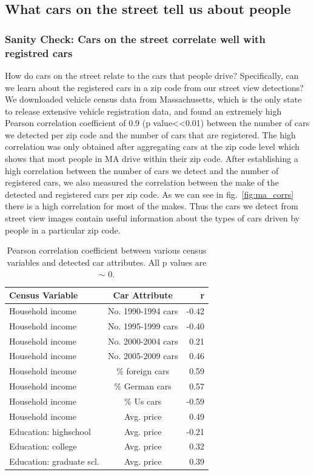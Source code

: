 \documentclass[10pt,twocolumn,letterpaper]{article}
\begin{document}
\subsection{What cars on the street tell us about people}
\subsubsection{Sanity Check: Cars on the street correlate well with registred cars}
How do cars on the street relate to the cars that people drive? Specifically, can we learn about the registered cars in a zip code from our street view detections?
We downloaded vehicle census data from Massachusetts, which is the only state to release extensive vehicle registration data, and found an extremely high Pearson correlation coefficient of 0.9 (p value<<0.01) between the number of cars we detected per zip code and the number of cars that are registered. The high correlation was only obtained after aggregating cars at the zip code level which shows that most people in MA drive within their zip code. 
After establishing a high correlation between the number of cars we detect and the number of registered cars, we also measured the correlation between the make of the detected and registered cars per zip code. As we can see in fig.~\ref{fig:ma_corrs} there is a high correlation for most of the makes. Thus the cars we detect from street view images contain useful information about the types of cars driven by people in a particular zip code.

\begin{table}
\begin{center}
\begin{tabular}{|l|c|r|}
\hline
\textbf{Census Variable} & \textbf{Car Attribute} & \textbf{r}  \\
\hline\hline
Household income & No. 1990-1994 cars & -0.42 \\
Household income & No. 1995-1999 cars & -0.40 \\
Household income & No. 2000-2004 cars & 0.21 \\
Household income & No. 2005-2009 cars & 0.46 \\
Household income & \% foreign cars & 0.59 \\
Household income & \% German cars & 0.57 \\
Household income & \% Us cars & -0.59 \\
Household income & Avg. price & 0.49 \\
Education: highschool & Avg. price & -0.21 \\
Education: college & Avg. price & 0.32 \\
Education: graduate scl. & Avg. price & 0.39 \\
\hline
\end{tabular}
\end{center}
\caption{Pearson correlation coefficient between various census variables and detected car attributes. All p values are \(\sim\) 0.}
\label{table:car-census-corrs}
\end{table}
\end{document}

